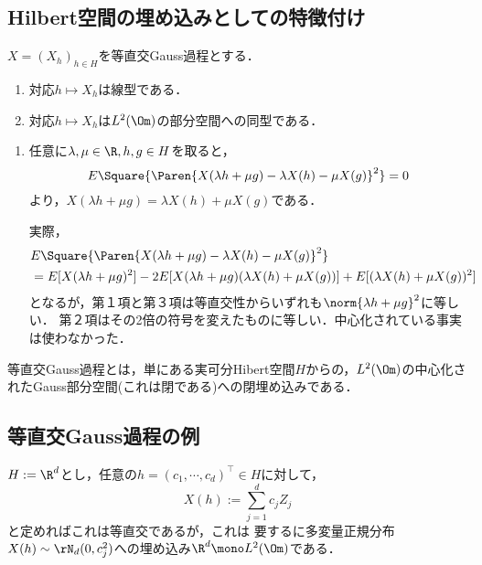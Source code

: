 \documentclass[uplatex,dvipdfmx]{jsreport}
\begin{document}
\subsection{Hilbert空間の埋め込みとしての特徴付け}

\begin{proposition}[等直交Gauss過程は線型空間の埋め込み]
    $X=(X_h)_{h\in H}$を等直交Gauss過程とする．
    \begin{enumerate}
        \item 対応$h\mapsto X_h$は線型である．
        \item 対応$h\mapsto X_h$は$L^2(\Om)$の部分空間への同型である．
    \end{enumerate}
\end{proposition}
\begin{Proof}\mbox{}
    \begin{enumerate}
        \item 任意に$\lambda,\mu\in\R,h,g\in H$を取ると，
        \[E\Square{\Paren{X(\lambda h+\mu g)-\lambda X(h)-\mu X(g)}^2}=0\]
        より，$X(\lambda h+\mu g)=\lambda X(h)+\mu X(g)$である．

        実際，
        \begin{align*}
            &E\Square{\Paren{X(\lambda h+\mu g)-\lambda X(h)-\mu X(g)}^2}\\
            &=E[X(\lambda h+\mu g)^2]-2E[X(\lambda h+\mu g)(\lambda X(h)+\mu X(g))]+E[(\lambda X(h)+\mu X(g))^2]
        \end{align*}
        となるが，第１項と第３項は等直交性からいずれも$\norm{\lambda h+\mu g}^2$に等しい．
        第２項はその2倍の符号を変えたものに等しい．中心化されている事実は使わなかった．
    \end{enumerate}
\end{Proof}
\begin{remarks}
    等直交Gauss過程とは，単にある実可分Hibert空間$H$からの，$L^2(\Om)$の中心化されたGauss部分空間(これは閉である)への閉埋め込みである．
\end{remarks}

\subsection{等直交Gauss過程の例}

\begin{example}[多変量正規分布の全体]
    $H:=\R^d$とし，任意の$h=(c_1,\cdots,c_d)^\top\in H$に対して，
    \[X(h):=\sum_{j=1}^dc_jZ_j\]
    と定めればこれは等直交であるが，これは
    要するに多変量正規分布$X(h)\sim\rN_d(0,c_j^2)$への埋め込み$\R^d\mono L^2(\Om)$である．
\end{example}
\end{document}
